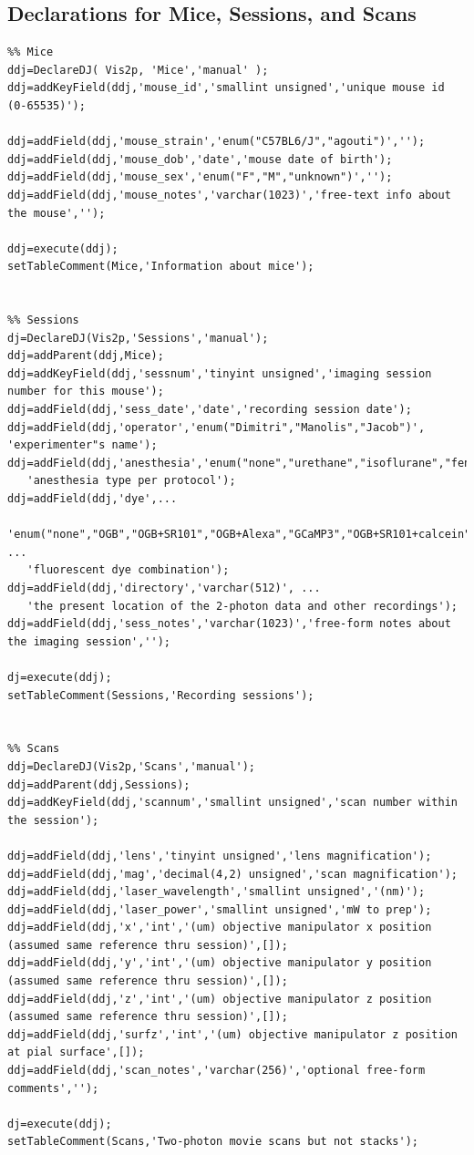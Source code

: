 \documentclass[10pt]{article}
\begin{document}
\subsection{Declarations for Mice, Sessions, and Scans}\label{sec:mice}
\begin{lstlisting}
%% Mice 
ddj=DeclareDJ( Vis2p, 'Mice','manual' );
ddj=addKeyField(ddj,'mouse_id','smallint unsigned','unique mouse id (0-65535)');

ddj=addField(ddj,'mouse_strain','enum("C57BL6/J","agouti")','');
ddj=addField(ddj,'mouse_dob','date','mouse date of birth');
ddj=addField(ddj,'mouse_sex','enum("F","M","unknown")','');
ddj=addField(ddj,'mouse_notes','varchar(1023)','free-text info about the mouse','');

ddj=execute(ddj);
setTableComment(Mice,'Information about mice');


%% Sessions
dj=DeclareDJ(Vis2p,'Sessions','manual');
ddj=addParent(ddj,Mice);
ddj=addKeyField(ddj,'sessnum','tinyint unsigned','imaging session number for this mouse');
ddj=addField(ddj,'sess_date','date','recording session date');
ddj=addField(ddj,'operator','enum("Dimitri","Manolis","Jacob")', 'experimenter"s name');
ddj=addField(ddj,'anesthesia','enum("none","urethane","isoflurane","fentanyl")',...
   'anesthesia type per protocol');
ddj=addField(ddj,'dye',...
   'enum("none","OGB","OGB+SR101","OGB+Alexa","GCaMP3","OGB+SR101+calcein")', ...
   'fluorescent dye combination');
ddj=addField(ddj,'directory','varchar(512)', ...
   'the present location of the 2-photon data and other recordings');
ddj=addField(ddj,'sess_notes','varchar(1023)','free-form notes about the imaging session','');

dj=execute(ddj);
setTableComment(Sessions,'Recording sessions');


%% Scans
ddj=DeclareDJ(Vis2p,'Scans','manual');
ddj=addParent(ddj,Sessions);
ddj=addKeyField(ddj,'scannum','smallint unsigned','scan number within the session');

ddj=addField(ddj,'lens','tinyint unsigned','lens magnification');
ddj=addField(ddj,'mag','decimal(4,2) unsigned','scan magnification');
ddj=addField(ddj,'laser_wavelength','smallint unsigned','(nm)');
ddj=addField(ddj,'laser_power','smallint unsigned','mW to prep');
ddj=addField(ddj,'x','int','(um) objective manipulator x position (assumed same reference thru session)',[]);
ddj=addField(ddj,'y','int','(um) objective manipulator y position (assumed same reference thru session)',[]);
ddj=addField(ddj,'z','int','(um) objective manipulator z position (assumed same reference thru session)',[]);
ddj=addField(ddj,'surfz','int','(um) objective manipulator z position at pial surface',[]);
ddj=addField(ddj,'scan_notes','varchar(256)','optional free-form comments','');

dj=execute(ddj);
setTableComment(Scans,'Two-photon movie scans but not stacks');
\end{lstlisting}
\end{document}
